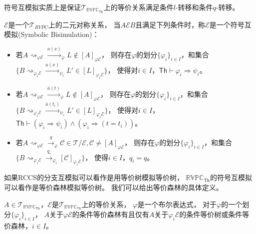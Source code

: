 符号互模拟实质上是保证$\mathcal{T}_{\mathbb{RVPC}_{\mathsf{Th}}}$上的等价关系满足条件$l$-转移和条件$q$-转移。
\begin{definition}[符号互模拟]\label{def:rvpc_symbolic_bisimulation}
   $\mathcal{E}$是一个$\mathcal{T}_{RVPC}$上的二元对称关系，
当$A\mathcal{E}B$且满足下列条件时，称$\mathcal{E}$是一个符号互模拟(Symbolic Bisimulation)：
\begin{itemize}
   \item {
      若$ A \rightsquigarrow_{\varphi \mathcal{E}}\stackrel{a(x)}{\rightarrow}_{\varphi} L\notin [A]_{\varphi \mathcal{E}}$，
      则存在$\varphi$的划分$\{\varphi_i\}_{i\in I}$，和集合$\{B\rightsquigarrow_{\varphi_i \mathcal{E}}\stackrel{a(x)}{\rightarrow}_{\psi_i} L'\in[L]_{\varphi_i\mathcal{E}}\}$，
      使得对$i\in I$，$\mathsf{Th}\vdash \varphi_i \Rightarrow \psi_i$。
   }
   \item {
      若$A \rightsquigarrow_{\varphi \mathcal{E}}\stackrel{\bar{a}(t)}{\rightarrow}_{\varphi} L\notin [A]_{\varphi\mathcal{E}}$，
      则存在$\varphi$的划分$\{\varphi_i\}_{i\in I}$，和集合$\{B\rightsquigarrow_{\varphi_i\mathcal{E}}\stackrel{\bar{a}(t_i)}{\rightarrow}_{\psi_i} L'\in [L]_{\varphi_i\mathcal{E}}\}$，
      使得对$i\in I$，$\mathsf{Th}\vdash (\varphi_i \Rightarrow \psi_i)\wedge (\varphi_i \Rightarrow (t=t_i))$。
   }
   \item {
      若$ A\rightsquigarrow_{\varphi\mathcal{E}} \stackrel{q}{\rightarrow}_{\varphi} \mathcal{C}\in \mathcal{T}/\mathcal{E}, \mathcal{C}\neq [A]_{\varphi \mathcal{E}}$，
      则存在$\varphi$的划分$\{\varphi_i\}_{i\in I}$，和集合$\{B\rightsquigarrow_{\varphi_i\mathcal{E}}\stackrel{q_i}{\rightarrow}_{\varphi_i} [\mathcal{C}]_{\varphi_i\mathcal{E}}\}$，
      使得$i\in I$，$q_i= q$。
   }
\end{itemize}
\end{definition}

如果RCCS的分支互模拟可以看作是用等价树模拟等价树，
$\mathbb{RVPC}_{\mathsf{Th}}$的符号互模拟可以看作是等价森林模拟等价树。
我们可以给出等价森林的具体定义。

\begin{definition}[条件等价森林]
   $A\in\mathcal{T}_{\mathbb{RVPC}_{\mathsf{Th}}}$，$\mathcal{E}$是$\mathcal{T}_{\mathbb{RVPC}_{\mathsf{Th}}}$上的等价关系，
   $\varphi$是一个布尔表达式，
   对于$\varphi$的一个划分$\{\varphi_i\}_{i\in I}$，
   $A$关于$\varphi\mathcal{E}$的条件等价森林有且仅有$A$关于$\varphi_i\mathcal{E}$的条件等价树或条件等价森林，$i\in I$。
\end{definition}

